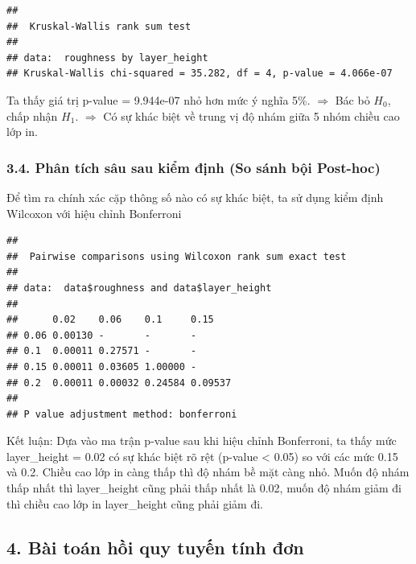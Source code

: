 \begin{verbatim}
## 
##  Kruskal-Wallis rank sum test
## 
## data:  roughness by layer_height
## Kruskal-Wallis chi-squared = 35.282, df = 4, p-value = 4.066e-07
\end{verbatim}

Ta thấy giá trị p-value = 9.944e-07 nhỏ hơn mức ý nghĩa 5\%.
\(\Rightarrow\) Bác bỏ \(H_0\), chấp nhận \(H_1\). 
\(\Rightarrow\) Có sự khác biệt về trung vị độ nhám giữa 5 nhóm chiều cao lớp in.
\subsubsection{3.4. Phân tích sâu sau kiểm định (So sánh bội Post-hoc)}

Để tìm ra chính xác cặp thông số nào có sự khác biệt, ta sử
dụng kiểm định Wilcoxon với hiệu chỉnh Bonferroni

\begin{Shaded}
\begin{Highlighting}[]
\OtherTok{\textless{}{-}} \SpecialCharTok{$$}\SpecialCharTok{$}
                                        \NormalTok{)}
\end{Highlighting}
\end{Shaded}

\begin{verbatim}
## 
##  Pairwise comparisons using Wilcoxon rank sum exact test 
## 
## data:  data$roughness and data$layer_height 
## 
##      0.02    0.06    0.1     0.15   
## 0.06 0.00130 -       -       -      
## 0.1  0.00011 0.27571 -       -      
## 0.15 0.00011 0.03605 1.00000 -      
## 0.2  0.00011 0.00032 0.24584 0.09537
## 
## P value adjustment method: bonferroni
\end{verbatim}

Kết luận: Dựa vào ma trận p-value sau khi hiệu chỉnh Bonferroni, ta thấy mức layer\_height = 0.02 có sự khác biệt rõ rệt (p-value \textless{} 0.05) so với các mức 0.15 và 0.2. Chiều cao lớp in càng thấp thì độ nhám bề mặt càng nhỏ. Muốn độ nhám thấp nhất thì layer\_height cũng phải thấp nhất là 0.02, muốn độ nhám giảm đi thì chiều cao lớp in layer\_height cũng phải giảm đi.

\subsection*{4. Bài toán hồi quy tuyến tính đơn}

